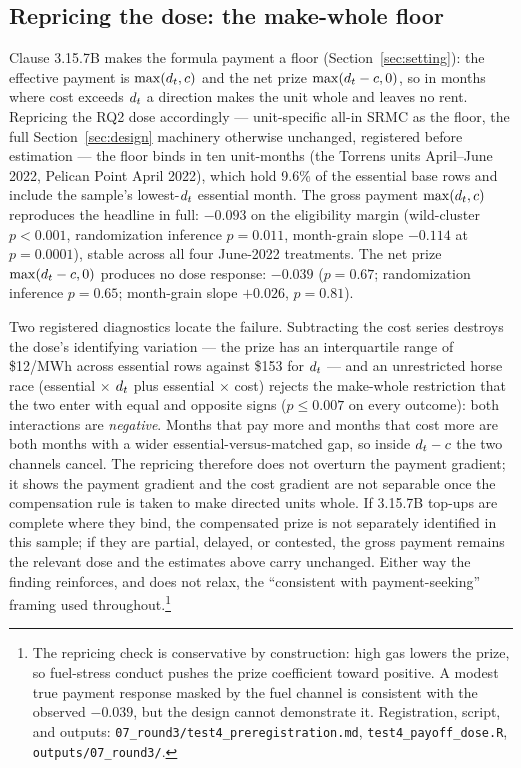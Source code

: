 \subsection{Repricing the dose: the make-whole floor}

Clause 3.15.7B makes the formula payment a floor (Section~\ref{sec:setting}):
the effective payment is $\max(d_t, c)$ and the net prize $\max(d_t - c, 0)$,
so in months where cost exceeds $d_t$ a direction makes the unit whole and
leaves no rent. Repricing the RQ2 dose accordingly --- unit-specific all-in
SRMC as the floor, the full Section~\ref{sec:design} machinery otherwise
unchanged, registered before estimation --- the floor binds in ten unit-months
(the Torrens units April--June 2022, Pelican Point April 2022), which hold
9.6\% of the essential base rows and include the sample's lowest-$d_t$
essential month. The gross payment $\max(d_t, c)$ reproduces the headline in
full: $-0.093$ on the eligibility margin (wild-cluster $p<0.001$,
randomization inference $p=0.011$, month-grain slope $-0.114$ at $p=0.0001$),
stable across all four June-2022 treatments. The net prize
$\max(d_t - c, 0)$ produces no dose response: $-0.039$ ($p=0.67$;
randomization inference $p=0.65$; month-grain slope $+0.026$, $p=0.81$).

Two registered diagnostics locate the failure. Subtracting the cost series
destroys the dose's identifying variation --- the prize has an interquartile
range of \$12/MWh across essential rows against \$153 for $d_t$ --- and an
unrestricted horse race (essential $\times$ $d_t$ plus essential $\times$
cost) rejects the make-whole restriction that the two enter with equal and
opposite signs ($p\leq 0.007$ on every outcome): both interactions are
\emph{negative}. Months that pay more and months that cost more are both
months with a wider essential-versus-matched gap, so inside
$d_t - c$ the two channels cancel. The repricing therefore does not
overturn the payment gradient; it shows the payment gradient and the cost
gradient are not separable once the compensation rule is taken to make
directed units whole. If 3.15.7B top-ups are complete where they bind, the
compensated prize is not separately identified in this sample; if they are
partial, delayed, or contested, the gross payment remains the relevant dose
and the estimates above carry unchanged. Either way the finding reinforces,
and does not relax, the ``consistent with payment-seeking'' framing used
throughout.\footnote{The repricing check is conservative by construction:
high gas lowers the prize, so fuel-stress conduct pushes the prize
coefficient toward positive. A modest true payment response masked by the
fuel channel is consistent with the observed $-0.039$, but the design cannot
demonstrate it. Registration, script, and outputs:
\texttt{07\_round3/test4\_preregistration.md}, \texttt{test4\_payoff\_dose.R},
\texttt{outputs/07\_round3/}.}

